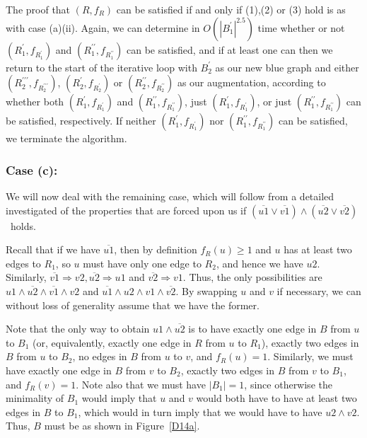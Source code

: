 \documentclass{article}
\newtheorem{Proof of Theorem}{Proof of Theorem}
\begin{document}
The proof that $(R,f_{R})$ can be satisfied if and only if (1),(2) or (3) hold is as with case (a)(ii).
Again, we can determine in $O \left( |B_{1}^{\prime}|^{2.5} \right)$ time whether or not 
$\left( R_{1}^{\prime},f_{R_{1}^{\prime}} \right)$ and $\left( R_{1}^{\prime\prime},f_{R_{1}^{\prime\prime}} \right)$ 
can be satisfied,
and if at least one can
then we return to the start of the iterative loop with $B_{2}^{\prime}$ as our new blue graph 
and either 
$(R_{2}^{\prime\prime\prime},f_{R_{2}^{\prime\prime\prime}})$,
$(R_{2}^{\prime},f_{R_{2}^{\prime}})$ or $(R_{2}^{\prime\prime},f_{R_{2}^{\prime\prime}})$ as our augmentation,
according to whether both 
$\left( R_{1}^{\prime},f_{R_{1}^{\prime}} \right)$ and $\left( R_{1}^{\prime\prime},f_{R_{1}^{\prime\prime}} \right)$,
just $\left( R_{1}^{\prime},f_{R_{1}^{\prime}} \right)$,
or just $\left( R_{1}^{\prime\prime},f_{R_{1}^{\prime\prime}} \right)$
can be satisfied, respectively. 
If neither $\left( R_{1}^{\prime},f_{R_{1}^{\prime}} \right)$
nor $\left( R_{1}^{\prime\prime},f_{R_{1}^{\prime\prime}} \right)$ can be satisfied,
we terminate the algorithm. 





\subsubsection*{Case (c): }





We will now deal with the remaining case,
which will follow from a detailed investigated of the properties that are forced upon us 
if $(\overline{u1} \lor \overline{v1}) \land (\overline{u2} \lor \overline{v2})$~holds.

Recall that if we have $\overline{u1}$,
then by definition $f_{R}(u) \geq 1$ and $u$ has at least two edges to $R_{1}$,
so $u$ must have only one edge to $R_{2}$,
and hence we have $u2$.
Similarly,
$\overline{v1} \Rightarrow v2, \overline{u2} \Rightarrow u1$ and $\overline{v2} \Rightarrow v1$.
Thus, the only possibilities are $u1 \land \overline{u2} \land \overline{v1} \land v2$
and $\overline{u1} \land u2 \land v1 \land \overline{v2}$.
By swapping $u$ and $v$ if necessary,
we can without loss of generality assume that we have the former.

Note that the only way to obtain $u1 \land \overline{u2}$
is to have exactly one edge in $B$ from $u$ to $B_{1}$
(or, equivalently, exactly one edge in $R$ from $u$ to $R_{1}$),
exactly two edges in $B$ from $u$ to $B_{2}$,
no edges in $B$ from $u$ to $v$,
and $f_{R}(u)=1$.
Similarly, we must have exactly one edge in $B$ from $v$ to $B_{2}$,
exactly two edges in $B$ from $v$ to $B_{1}$,
and $f_{R}(v)=1$.
Note also that we must have $|B_{1}|=1$,
since otherwise the minimality of $B_{1}$ would imply that $u$ and $v$ 
would both have to have at least two edges in $B$ to $B_{1}$,
which would in turn imply that we would have to have $u2 \land v2$.
Thus, $B$ must be as shown in Figure~\ref{D14a}.
\end{document}
